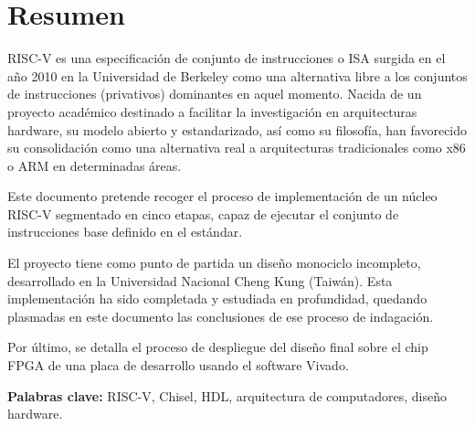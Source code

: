 \chapter*{Resumen}

RISC-V es una especificación de conjunto de instrucciones o ISA surgida en el año 2010 en la Universidad de Berkeley como una alternativa libre a los conjuntos de instrucciones (privativos) dominantes en aquel momento. Nacida de un proyecto académico destinado a facilitar la investigación en arquitecturas hardware, su modelo abierto y estandarizado, así como su filosofía, han favorecido su consolidación como una alternativa real a arquitecturas tradicionales como x86 o ARM en determinadas áreas.

Este documento pretende recoger el proceso de implementación de un núcleo RISC-V segmentado en cinco etapas, capaz de ejecutar el conjunto de instrucciones base definido en el estándar.

El proyecto tiene como punto de partida un diseño monociclo incompleto, desarrollado en la Universidad Nacional Cheng Kung (Taiwán). Esta implementación ha sido completada y estudiada en profundidad, quedando plasmadas en este documento las conclusiones de ese proceso de indagación.

Por último, se detalla el proceso de despliegue del diseño final sobre el chip FPGA de una placa de desarrollo usando el software Vivado.\newline\newline

\textbf{Palabras clave:} RISC-V, Chisel, HDL, arquitectura de computadores, diseño hardware.